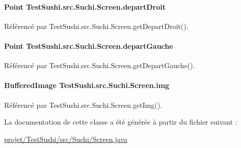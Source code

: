 \paragraph[{depart\+Droit}]{\setlength{\rightskip}{0pt plus 5cm}Point Test\+Sushi.\+src.\+Suchi.\+Screen.\+depart\+Droit\hspace{0.3cm}{\ttfamily [private]}}\label{classTestSushi_1_1src_1_1Suchi_1_1Screen_ab93cdda9b1c3faf212983f934b9d2158}


Référencé par Test\+Sushi.\+src.\+Suchi.\+Screen.\+get\+Depart\+Droit().

\hypertarget{classTestSushi_1_1src_1_1Suchi_1_1Screen_a9b1b16c289d044920e7a8b29b7316dad}{}
\paragraph[{depart\+Gauche}]{\setlength{\rightskip}{0pt plus 5cm}Point Test\+Sushi.\+src.\+Suchi.\+Screen.\+depart\+Gauche\hspace{0.3cm}{\ttfamily [private]}}\label{classTestSushi_1_1src_1_1Suchi_1_1Screen_a9b1b16c289d044920e7a8b29b7316dad}


Référencé par Test\+Sushi.\+src.\+Suchi.\+Screen.\+get\+Depart\+Gauche().

\hypertarget{classTestSushi_1_1src_1_1Suchi_1_1Screen_a4bcdef3ac769229ad8a2e825c20e3d69}{}
\paragraph[{img}]{\setlength{\rightskip}{0pt plus 5cm}Buffered\+Image Test\+Sushi.\+src.\+Suchi.\+Screen.\+img\hspace{0.3cm}{\ttfamily [private]}}\label{classTestSushi_1_1src_1_1Suchi_1_1Screen_a4bcdef3ac769229ad8a2e825c20e3d69}


Référencé par Test\+Sushi.\+src.\+Suchi.\+Screen.\+get\+Img().



La documentation de cette classe a été générée à partir du fichier suivant \+:\begin{DoxyCompactItemize}
\item 
\hyperlink{projet_2TestSushi_2src_2Suchi_2Screen_8java}{projet/\+Test\+Sushi/src/\+Suchi/\+Screen.\+java}\end{DoxyCompactItemize}
